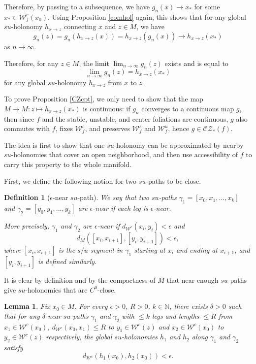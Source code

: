 \documentclass[11pt]{amsart}
\numberwithin{equation}{section}
\newcommand{\N}{\mathbb{N}}
\newcommand{\W}{\mathcal{W}}
\newcommand{\CZ}{\mathcal{CZ}}
\theoremstyle{plain}
\newtheorem{lem}[thm]{Lemma}
\newtheorem{defi}{Definition}[section]
\begin{document}
Therefore, by passing to a subsequence, we have $g_n(x)\to x_*$ for some $x_*\in \W^c_f(x_0)$. Using Proposition \ref{comhol} again, this shows that for any global $su$-holonomy $h_{x\to z}$ connecting $x$ and $z\in M$, we have
$$g_n(z)=g_n(h_{x\to z}(x))=h_{x\to z}(g_n(x))\to h_{x\to z}(x_*)$$
as $n\to \infty$.

Therefore, for any $z\in M$, the limit $\lim_{n\to \infty} g_n(z)$ exists and is equal to
$$\lim_{n\to \infty} g_n(z)=h_{x\to z}(x_*)$$
for any global $su$-holonomy $h_{x\to z}$ from $x$ to $z$.

To prove Proposition \ref{CZcpt}, we only need to show that the map $M \to M: z\mapsto h_{x\to z}(x_*)$ is continuous: if $g_n$ converges to a continuous map $g$, then since $f$ and the stable, unstable, and center foliations are continuous, $g$ also commutes with $f$, fixes $\W^c_f$, and preserves $\W^s_f$ and $\W^u_f$, hence $g\in \CZ_*(f)$.

The idea is first to show that one $su$-holonomy can be approximated by nearby $su$-holonomies that cover an open neighborhood, and then use accessibility of $f$ to carry this property to the whole manifold.

First, we define the following notion for two $su$-paths to be close.

\begin{defi}[$\epsilon$-near $su$-path]
We say that two $su$-paths $\gamma_1=[x_0,x_1,...,x_k]$ and $\gamma_2=[y_0,y_1,...,y_k]$ are $\epsilon$-near if each leg is $\epsilon$-near.

More precisely, $\gamma_1$ and $\gamma_2$ are $\epsilon$-near if $d_{\W^c}(x_i,y_i)<\epsilon$ and
$$d_M([x_i,x_{i+1}],[y_i,y_{i+1}])<\epsilon,$$
where $[x_i,x_{i+1}]$ is the $s/u$-segment in $\gamma_1$ starting at $x_i$ and ending at $x_{i+1}$, and $[y_i,y_{i+1}]$ is defined similarly.
\end{defi}

It is clear by definition and by the compactness of $M$ that near-enough $su$-paths give $su$-holonomies that are $C^0$-close.

\begin{lem}\label{sucont}
Fix $x_0\in M$. For every $\epsilon>0$, $R>0$, $k\in \N$, there exists $\delta>0$ such that for any $\delta$-near $su$-paths $\gamma_1$ and $\gamma_2$ with $\le k$ legs and lengths $\le R$ from $x_1\in \W^c(x_0)$, $d_{\W^c}(x_0,x_1)\le R$ to $y_1\in \W^c(z)$ and $x_2\in \W^c(x_0)$ to $y_2\in \W^c(z)$ respectively, the global $su$-holonomies $h_1$ and $h_2$ along $\gamma_1$ and $\gamma_2$ satisfy
$$d_{\W^c}(h_1(x_0),h_2(x_0)) <\epsilon.$$
\end{lem}
\end{document}
